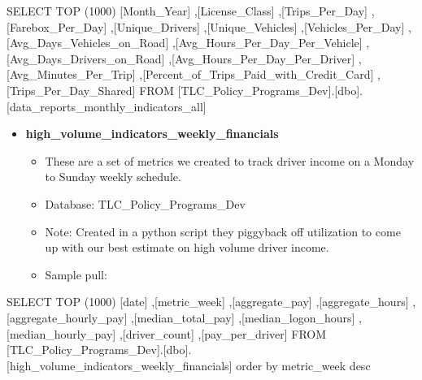 \documentclass[
]{book}
\newenvironment{Shaded}{\begin{snugshade}}{\end{snugshade}}
\newcommand{\DecValTok}[1]{\textcolor[rgb]{0.00,0.00,0.81}{#1}}
\newcommand{\FunctionTok}[1]{\textcolor[rgb]{0.00,0.00,0.00}{#1}}
\newcommand{\NormalTok}[1]{#1}
\providecommand{\tightlist}{%
  \setlength{\itemsep}{0pt}\setlength{\parskip}{0pt}}
\begin{document}
\begin{Shaded}
\begin{Highlighting}[]
\NormalTok{SELECT }\FunctionTok{TOP}\NormalTok{ (}\DecValTok{1000}\NormalTok{) [Month\_Year]}
\NormalTok{      ,[License\_Class]}
\NormalTok{      ,[Trips\_Per\_Day]}
\NormalTok{      ,[Farebox\_Per\_Day]}
\NormalTok{      ,[Unique\_Drivers]}
\NormalTok{      ,[Unique\_Vehicles]}
\NormalTok{      ,[Vehicles\_Per\_Day]}
\NormalTok{      ,[Avg\_Days\_Vehicles\_on\_Road]}
\NormalTok{      ,[Avg\_Hours\_Per\_Day\_Per\_Vehicle]}
\NormalTok{      ,[Avg\_Days\_Drivers\_on\_Road]}
\NormalTok{      ,[Avg\_Hours\_Per\_Day\_Per\_Driver]}
\NormalTok{      ,[Avg\_Minutes\_Per\_Trip]}
\NormalTok{      ,[Percent\_of\_Trips\_Paid\_with\_Credit\_Card]}
\NormalTok{      ,[Trips\_Per\_Day\_Shared]}
\NormalTok{  FROM [TLC\_Policy\_Programs\_Dev].[dbo].[data\_reports\_monthly\_indicators\_all]}
\end{Highlighting}
\end{Shaded}

\begin{itemize}
\tightlist
\item
  \textbf{high\_volume\_indicators\_weekly\_financials}

  \begin{itemize}
  \tightlist
  \item
    These are a set of metrics we created to track driver income on a Monday to Sunday weekly schedule.
  \item
    Database: TLC\_Policy\_Programs\_Dev
  \item
    Note: Created in a python script they piggyback off utilization to come up with our best estimate on high volume driver income.
  \item
    Sample pull:
  \end{itemize}
\end{itemize}

\begin{Shaded}
\begin{Highlighting}[]
\NormalTok{SELECT }\FunctionTok{TOP}\NormalTok{ (}\DecValTok{1000}\NormalTok{) [date]}
\NormalTok{      ,[metric\_week]}
\NormalTok{      ,[aggregate\_pay]}
\NormalTok{      ,[aggregate\_hours]}
\NormalTok{      ,[aggregate\_hourly\_pay]}
\NormalTok{      ,[median\_total\_pay]}
\NormalTok{      ,[median\_logon\_hours]}
\NormalTok{      ,[median\_hourly\_pay]}
\NormalTok{      ,[driver\_count]}
\NormalTok{      ,[pay\_per\_driver]}
\NormalTok{  FROM [TLC\_Policy\_Programs\_Dev].[dbo].[high\_volume\_indicators\_weekly\_financials]}
\NormalTok{  order by metric\_week desc}
\end{Highlighting}
\end{Shaded}
\end{document}
